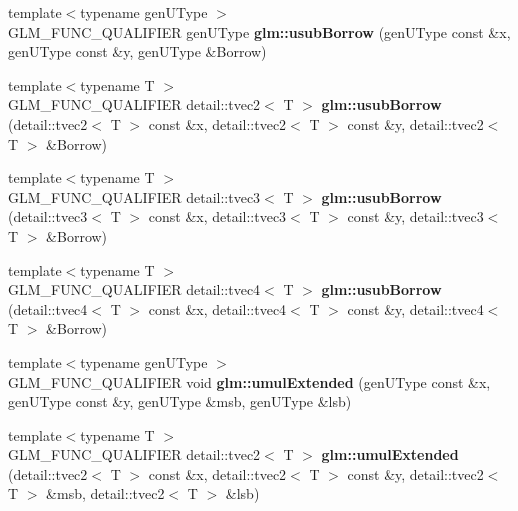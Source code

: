 \begin{DoxyCompactItemize}
\item 
\hypertarget{namespaceglm_a350733b285725dce32dc0952ee5724bd}{{\footnotesize template$<$typename gen\-U\-Type $>$ }\\\-G\-L\-M\-\_\-\-F\-U\-N\-C\-\_\-\-Q\-U\-A\-L\-I\-F\-I\-E\-R gen\-U\-Type {\bfseries glm\-::usub\-Borrow} (gen\-U\-Type const \&x, gen\-U\-Type const \&y, gen\-U\-Type \&\-Borrow)}\label{namespaceglm_a350733b285725dce32dc0952ee5724bd}

\item 
\hypertarget{namespaceglm_a532498a426298055126dff6955e00e06}{{\footnotesize template$<$typename T $>$ }\\\-G\-L\-M\-\_\-\-F\-U\-N\-C\-\_\-\-Q\-U\-A\-L\-I\-F\-I\-E\-R \*
detail\-::tvec2$<$ \-T $>$ {\bfseries glm\-::usub\-Borrow} (detail\-::tvec2$<$ \-T $>$ const \&x, detail\-::tvec2$<$ \-T $>$ const \&y, detail\-::tvec2$<$ \-T $>$ \&\-Borrow)}\label{namespaceglm_a532498a426298055126dff6955e00e06}

\item 
\hypertarget{namespaceglm_a610ad53d0c72bd94246246036a3d5b0a}{{\footnotesize template$<$typename T $>$ }\\\-G\-L\-M\-\_\-\-F\-U\-N\-C\-\_\-\-Q\-U\-A\-L\-I\-F\-I\-E\-R \*
detail\-::tvec3$<$ \-T $>$ {\bfseries glm\-::usub\-Borrow} (detail\-::tvec3$<$ \-T $>$ const \&x, detail\-::tvec3$<$ \-T $>$ const \&y, detail\-::tvec3$<$ \-T $>$ \&\-Borrow)}\label{namespaceglm_a610ad53d0c72bd94246246036a3d5b0a}

\item 
\hypertarget{namespaceglm_aafb35ca5600ad9f1e550d9c801929c52}{{\footnotesize template$<$typename T $>$ }\\\-G\-L\-M\-\_\-\-F\-U\-N\-C\-\_\-\-Q\-U\-A\-L\-I\-F\-I\-E\-R \*
detail\-::tvec4$<$ \-T $>$ {\bfseries glm\-::usub\-Borrow} (detail\-::tvec4$<$ \-T $>$ const \&x, detail\-::tvec4$<$ \-T $>$ const \&y, detail\-::tvec4$<$ \-T $>$ \&\-Borrow)}\label{namespaceglm_aafb35ca5600ad9f1e550d9c801929c52}

\item 
\hypertarget{namespaceglm_aa28d4feb9d63bbd9230066696e2648be}{{\footnotesize template$<$typename gen\-U\-Type $>$ }\\\-G\-L\-M\-\_\-\-F\-U\-N\-C\-\_\-\-Q\-U\-A\-L\-I\-F\-I\-E\-R void {\bfseries glm\-::umul\-Extended} (gen\-U\-Type const \&x, gen\-U\-Type const \&y, gen\-U\-Type \&msb, gen\-U\-Type \&lsb)}\label{namespaceglm_aa28d4feb9d63bbd9230066696e2648be}

\item 
\hypertarget{namespaceglm_afd73bd0bfe3b486ad3609a4f3b335a92}{{\footnotesize template$<$typename T $>$ }\\\-G\-L\-M\-\_\-\-F\-U\-N\-C\-\_\-\-Q\-U\-A\-L\-I\-F\-I\-E\-R \*
detail\-::tvec2$<$ \-T $>$ {\bfseries glm\-::umul\-Extended} (detail\-::tvec2$<$ \-T $>$ const \&x, detail\-::tvec2$<$ \-T $>$ const \&y, detail\-::tvec2$<$ \-T $>$ \&msb, detail\-::tvec2$<$ \-T $>$ \&lsb)}\label{namespaceglm_afd73bd0bfe3b486ad3609a4f3b335a92}


\end{DoxyCompactItemize}
